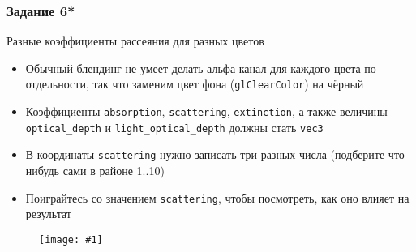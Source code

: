 \documentclass{beamer}
\newcommand{\slideimage}[1]{
  \begin{figure}
    \begin{adjustbox}{width=\textwidth, totalheight=\textheight-2\baselineskip-2\baselineskip,keepaspectratio}
      \texttt{[image: \#1]}
    \end{adjustbox}
  \end{figure}
}
\begin{document}
\begin{frame}[fragile]
\frametitle{Задание 6*}
Разные коэффициенты рассеяния для разных цветов
\begin{itemize}
\item Обычный блендинг не умеет делать альфа-канал для каждого цвета по отдельности, так что заменим цвет фона (\verb|glClearColor|) на чёрный
\item Коэффициенты \verb|absorption|, \verb|scattering|, \verb|extinction|, а также величины \verb|optical_depth| и \verb|light_optical_depth| должны стать \verb|vec3|
\item В координаты \verb|scattering| нужно записать три разных числа (подберите что-нибудь сами в районе 1..10)
\item Поиграйтесь со значением \verb|scattering|, чтобы посмотреть, как оно влияет на результат
\end{itemize}
\end{frame}

\begin{frame}[fragile]
\slideimage{6.png}
\end{frame}
\end{document}
